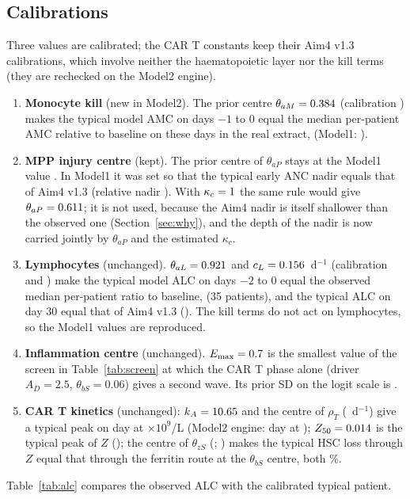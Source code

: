 \documentclass[11pt]{article}
\begin{document}
\subsection{Calibrations}
Three values are calibrated; the CAR T constants keep their Aim4 v1.3 calibrations, which involve neither the haematopoietic layer nor the kill terms (they are rechecked on the Model2 engine).
\begin{enumerate}
\item \textbf{Monocyte kill} (new in Model2). The prior centre $\theta_{aM}=0.384$ (calibration \valThAmCal) makes the typical model AMC on days $-1$ to 0 equal the median per-patient AMC relative to baseline on these days in the real extract, \valAmcTarget{} (Model1: \valAmcLdModelOne).
\item \textbf{MPP injury centre} (kept). The prior centre of $\theta_{aP}$ stays at the Model1 value \valThapCentre. In Model1 it was set so that the typical early ANC nadir equals that of Aim4 v1.3 (relative nadir \valAncNadirAimFour). With $\kappa_c=1$ the same rule would give $\theta_{aP}=0.611$; it is not used, because the Aim4 nadir is itself shallower than the observed one (Section~\ref{sec:why}), and the depth of the nadir is now carried jointly by $\theta_{aP}$ and the estimated $\kappa_c$.
\item \textbf{Lymphocytes} (unchanged). $\theta_{aL}=0.921$ and $c_L=0.156$~d$^{-1}$ (calibration \valThalCal{} and \valClCal) make the typical model ALC on days $-2$ to 0 equal the observed median per-patient ratio to baseline, \valAlcTarget{} (35 patients), and the typical ALC on day 30 equal that of Aim4 v1.3 (\valAlcDayThirty). The kill terms do not act on lymphocytes, so the Model1 values are reproduced.
\item \textbf{Inflammation centre} (unchanged). $E_{\max}=0.7$ is the smallest value of the screen in Table~\ref{tab:screen} at which the CAR T phase alone (driver $A_D=2.5$, $\theta_{bS}=0.06$) gives a second wave. Its prior SD on the logit scale is \valEmaxSd.
\item \textbf{CAR T kinetics} (unchanged): $k_A=10.65$ and the centre of $\rho_T$ (\valRhoCentre~d$^{-1}$) give a typical peak on day \valCartPeakDay{} at \valCartPeak{} $\times10^9$/L (Model2 engine: day \valCartPeakDayModel{} at \valCartPeakModel); $Z_{50}=0.014$ is the typical peak of $Z$ (\valZfiftyModel); the centre of $\theta_{zS}$ (\valThzs; \valThzsModel) makes the typical HSC loss through $Z$ equal that through the ferritin route at the $\theta_{bS}$ centre, both \valRouteLoss\%.
\end{enumerate}
Table~\ref{tab:alc} compares the observed ALC with the calibrated typical patient.
\end{document}
